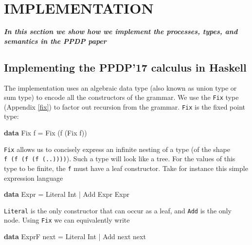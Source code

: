\documentclass[runningheads,plain]{llncs}
\newenvironment{Shaded}{}{}
\newcommand{\KeywordTok}[1]{\textcolor[rgb]{0.00,0.44,0.13}{\textbf{#1}}}
\newcommand{\DataTypeTok}[1]{\textcolor[rgb]{0.56,0.13,0.00}{#1}}
\newcommand{\FunctionTok}[1]{\textcolor[rgb]{0.02,0.16,0.49}{#1}}
\newcommand{\NormalTok}[1]{#1}
\begin{document}
\section{IMPLEMENTATION}
\textbf{\emph{In this section we show how we implement the processes, types, and semantics in the PPDP paper}}

\subsection{Implementing the PPDP'17 calculus in
Haskell}\label{implementing-the-ppdp17-calculus-in-haskell}

The implementation uses an algebraic data type (also known as union type or sum type) to
encode all the constructors of the grammar. We use the \texttt{Fix} type
(Appendix \ref{fix}) to factor out recursion from the grammar.
\texttt{Fix} is the fixed point type:

\begin{Shaded}
\begin{Highlighting}[]
\KeywordTok{data} \DataTypeTok{Fix}\NormalTok{ f }\FunctionTok{=} \DataTypeTok{Fix}\NormalTok{ (f (}\DataTypeTok{Fix}\NormalTok{ f))}
\end{Highlighting}
\end{Shaded}

\texttt{Fix} allows us to concisely express an infinite nesting of a
type (of the shape \texttt{f\ (f\ (f\ (f\ (..))))}). Such a type will
look like a tree. For the values of this type to be finite, the
\texttt{f} must have a leaf constructor. Take for instance this simple
expression language

\begin{Shaded}
\begin{Highlighting}[]
\KeywordTok{data} \DataTypeTok{Expr}
    \FunctionTok{=} \DataTypeTok{Literal} \DataTypeTok{Int}
    \FunctionTok{|} \DataTypeTok{Add} \DataTypeTok{Expr} \DataTypeTok{Expr} 
\end{Highlighting}
\end{Shaded}

\texttt{Literal} is the only constructor that can occur as a leaf, and
\texttt{Add} is the only node. Using \texttt{Fix} we can equivalently
write

\begin{Shaded}
\begin{Highlighting}[]
\KeywordTok{data} \DataTypeTok{ExprF}\NormalTok{ next}
    \FunctionTok{=} \DataTypeTok{Literal} \DataTypeTok{Int}
    \FunctionTok{|} \DataTypeTok{Add}\NormalTok{ next next }
\end{Highlighting}
\end{Shaded}
\end{document}
